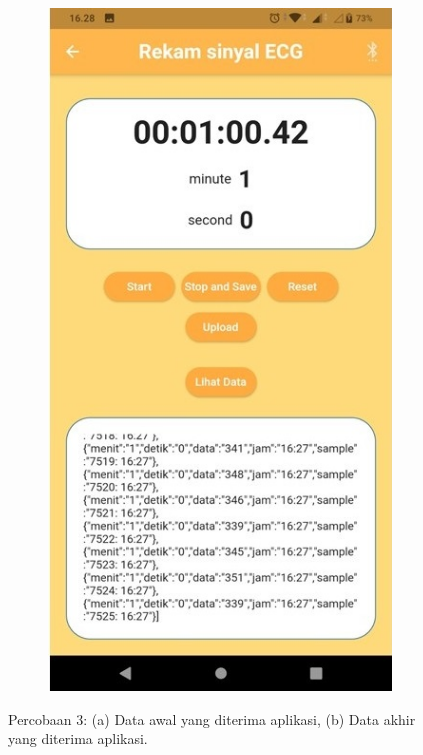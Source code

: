 \begin{figure}[!h]
	\begin{subfigure}{0.45\textwidth}
		\centering
		\includegraphics[width=1\linewidth]{img/percob/Slide13b.jpg}	  
		\caption{}		
	\end{subfigure}
	
	\caption{Percobaan 3: (a) Data awal yang diterima aplikasi, (b) Data akhir yang diterima aplikasi.}
	\label{fig:4.2.4}
\end{figure}
